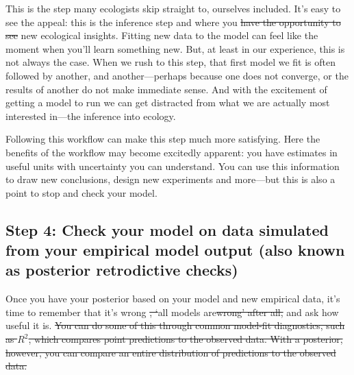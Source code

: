 \documentclass[11pt]{article}
\providecommand{\DIFaddtex}[1]{{\protect\color{blue}\uwave{#1}}} %
\providecommand{\DIFdeltex}[1]{{\protect\color{red}\sout{#1}}}                      %
\providecommand{\DIFaddbegin}{} %
\providecommand{\DIFaddend}{} %
\providecommand{\DIFdelbegin}{} %
\providecommand{\DIFdelend}{} %
\providecommand{\DIFadd}[1]{\texorpdfstring{\DIFaddtex{#1}}{#1}} %
\providecommand{\DIFdel}[1]{\texorpdfstring{\DIFdeltex{#1}}{}} %
\newcommand{\DIFscaledelfig}{0.5}
\newlength{\DIFdelgraphicswidth} %
\newlength{\DIFdelgraphicsheight} %
\newcommand{\DIFaddincludegraphics}[2][]{{\color{blue}\fbox{\DIFOincludegraphics[#1]{#2}}}} %
\newcommand{\DIFdelincludegraphics}[2][]{%
\sbox{\DIFdelgraphicsbox}{\DIFOincludegraphics[#1]{#2}}%
\settoboxwidth{\DIFdelgraphicswidth}{\DIFdelgraphicsbox} %
\settoboxtotalheight{\DIFdelgraphicsheight}{\DIFdelgraphicsbox} %
\scalebox{\DIFscaledelfig}{%
\parbox[b]{\DIFdelgraphicswidth}{\usebox{\DIFdelgraphicsbox}\\[-\baselineskip] \rule{\DIFdelgraphicswidth}{0em}}\llap{\resizebox{\DIFdelgraphicswidth}{\DIFdelgraphicsheight}{%
\setlength{\unitlength}{\DIFdelgraphicswidth}%
\begin{picture}(1,1)%
\thicklines\linethickness{2pt} %
{\color[rgb]{1,0,0}\put(0,0){\framebox(1,1){}}}%
{\color[rgb]{1,0,0}\put(0,0){\line( 1,1){1}}}%
{\color[rgb]{1,0,0}\put(0,1){\line(1,-1){1}}}%
\end{picture}%
}\hspace*{3pt}}} %
} %
\DeclareRobustCommand{\DIFaddbegin}{\DIFOaddbegin \let\includegraphics\DIFaddincludegraphics} %
\DeclareRobustCommand{\DIFaddend}{\DIFOaddend \let\includegraphics\DIFOincludegraphics} %
\DeclareRobustCommand{\DIFdelbegin}{\DIFOdelbegin \let\includegraphics\DIFdelincludegraphics} %
\DeclareRobustCommand{\DIFdelend}{\DIFOaddend \let\includegraphics\DIFOincludegraphics} %
\begin{document}
This is the step many ecologists skip straight to, ourselves included. It's easy to see the appeal: this is the inference step and where you \DIFdelbegin \DIFdel{have the opportunity to see }\DIFdelend \DIFaddbegin \DIFadd{might gain }\DIFaddend new ecological insights. Fitting new data to the model can feel like the moment when you'll learn something new. But, at least in our experience, this is not always the case. When we rush to this step, that first model we fit is often followed by another, and another---perhaps because one does not converge, or the results of another do not make immediate sense. And with the excitement of getting a model to run we can get distracted from what we are actually most interested in---the inference into ecology. %

Following this workflow can make this step much more satisfying. Here the benefits of the workflow may become excitedly apparent: you have estimates in useful units with uncertainty you can understand. You can use this information to draw new conclusions, design new experiments and more---but this is also a point to stop and check your model. 

\subsection*{Step 4: Check your model on data simulated from your empirical model output (also known as posterior retrodictive checks)} 

Once you have your posterior based on your model and new empirical data, it's time to remember that it's wrong \DIFdelbegin \DIFdel{, `}\DIFdelend \DIFaddbegin \DIFadd{(as }\DIFaddend all models are\DIFdelbegin \DIFdel{wrong' after all, }\DIFdelend \DIFaddbegin \DIFadd{) }\DIFaddend and ask how useful it is. \DIFdelbegin \DIFdel{You can do some of this through common model-fit diagnostics, such as $R^2$, which compares point predictions to the observed data. With a posterior, however, you can compare an entire distribution of predictions to the observed data. 
}%
\end{document}
